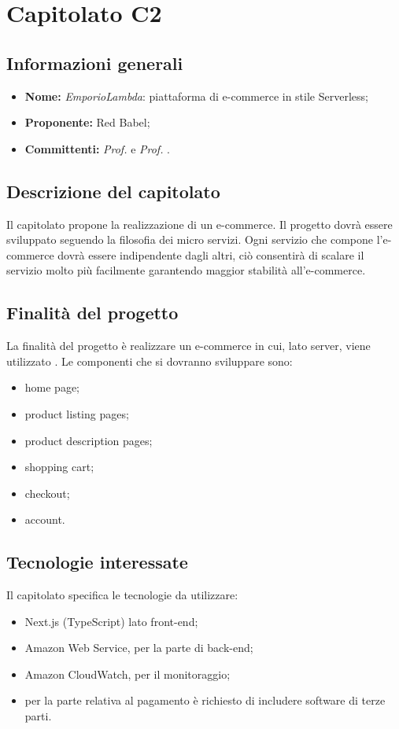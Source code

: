 \section{Capitolato C2}

\subsection{Informazioni generali}
\begin{itemize}
\item \textbf{Nome:} \textit{EmporioLambda}:  piattaforma di e-commerce in stile Serverless;
\item \textbf{Proponente:} Red Babel;
\item \textbf{Committenti:} \textit{Prof. \Tullio{}} e \textit{Prof. \Riccardo{}}.
\end{itemize}

\subsection{Descrizione del capitolato}
Il capitolato propone la realizzazione di un e-commerce. Il progetto dovrà essere sviluppato seguendo la filosofia dei micro servizi. Ogni servizio che compone l'e-commerce dovrà essere indipendente dagli altri, ciò consentirà di scalare il servizio molto più facilmente garantendo maggior stabilità all'e-commerce.

\subsection{Finalità del progetto}
La finalità del progetto è realizzare un e-commerce in cui, lato server, viene utilizzato . Le componenti che si dovranno sviluppare sono:
\begin{itemize}
\item home page;
\item product listing pages;
\item product description pages;
\item shopping cart;
\item checkout;
\item account.
\end{itemize}

\subsection{Tecnologie interessate}
Il capitolato specifica le tecnologie da utilizzare:
\begin{itemize}
\item Next.js (TypeScript) lato front-end;
\item Amazon Web Service, per la parte di back-end;
\item Amazon CloudWatch, per il monitoraggio;
\item per la parte relativa al pagamento è richiesto di includere software di terze parti.
\end{itemize}


